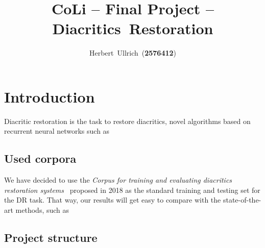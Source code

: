 \documentclass[12pt]{article}
\begin{document}
    \title{CoLi -- Final Project -- Diacritics~Restoration}
    \author{Herbert~Ullrich~(\textbf{2576412})}
    \maketitle
    \section{Introduction}
    Diacritic restoration is the task to restore diacritics, novel algorithms based on recurrent neural networks
    such as~\cite{naplava}
    \subsection{Used corpora}
    We have decided to use the \textit{Corpus for training and evaluating diacritics restoration systems}~\cite{corpus} proposed
    in 2018 as the standard training and testing set for the DR task.
    That way, our results will get easy to compare with the state-of-the-art methods, such as~\cite{naplava}
    \subsection{Project structure}
    
    
\end{document}
